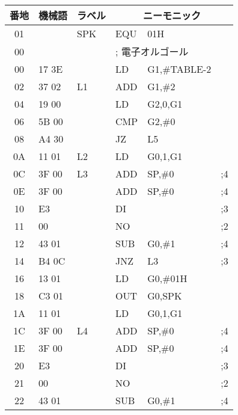 \begin{figure}[btp]
{\footnotesize\tt\begin{center}
\begin{tabular}{|c|l|l|l l l|} \hline
番地 & 機械語 & ラベル & \multicolumn{3}{|c|}{ニーモニック} \\
\hline
01 &              &  SPK    & EQU    & 01H         &   \\
00 &              &         & \multicolumn{3}{|l|}{; 電子オルゴール}\\
00 & 17 3E        &         & LD     & G1,\#TABLE-2&            \\
02 & 37 02        &  L1     & ADD    & G1,\#2      &            \\
04 & 19 00        &         & LD     & G2,0,G1     &            \\
06 & 5B 00        &         & CMP    & G2,\#0      &            \\
08 & A4 30        &         & JZ     & L5          &            \\
0A & 11 01        &  L2     & LD     & G0,1,G1     &            \\
0C & 3F 00        &  L3     & ADD    & SP,\#0      &   ;4       \\
0E & 3F 00        &         & ADD    & SP,\#0      &   ;4       \\
10 & E3           &         & DI     &             &   ;3       \\
11 & 00           &         & NO     &             &   ;2       \\
12 & 43 01        &         & SUB    & G0,\#1      &   ;4       \\
14 & B4 0C        &         & JNZ    & L3          &   ;3       \\
16 & 13 01        &         & LD     & G0,\#01H    &            \\
18 & C3 01        &         & OUT    & G0,SPK      &            \\
1A & 11 01        &         & LD     & G0,1,G1     &   	        \\
1C & 3F 00        &  L4     & ADD    & SP,\#0      &   ;4       \\
1E & 3F 00        &         & ADD    & SP,\#0      &   ;4       \\
20 & E3           &         & DI     &             &   ;3       \\
21 & 00           &         & NO     &             &   ;2       \\
22 & 43 01        &         & SUB    & G0,\#1      &   ;4       \\

\end{tabular}
\end{center}}
\end{figure}

